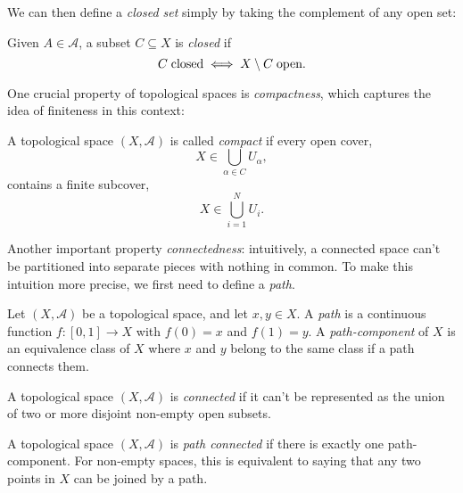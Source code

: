 We can then define a \emph{closed set} simply by taking the complement of any open set:

\begin{definition}
    Given $A \in \mathcal{A}$, a subset $C \subseteq X$ is \emph{closed} if
    \begin{equation}
        C \; \textup{closed} \iff X \setminus C \; \textup{open} .
    \end{equation}
\end{definition}

One crucial property of topological spaces is \emph{compactness}, which captures the idea of finiteness in this context:

\begin{definition}[Compact]
    A topological space $(X,\mathcal{A})$ is called \emph{compact} if every open cover,
    \begin{equation}
        X \in \bigcup_{\alpha \in C} U_\alpha ,
    \end{equation}
    contains a finite subcover,
    \begin{equation}
        X \in \bigcup_{i = 1}^N U_i .
    \end{equation}
\end{definition}

Another important property \emph{connectedness}: intuitively, a connected space can't be partitioned into separate pieces with nothing in common. To make this intuition more precise, we first need to define a \emph{path}.

\begin{definition}[Path]
    Let $(X, \mathcal{A})$ be a topological space, and let $x,y \in X$. A \emph{path} is a continuous function $f : [0,1] \to X$ with $f(0)=x$ and $f(1)=y$. A \emph{path-component} of $X$ is an equivalence class of $X$ where $x$ and $y$ belong to the same class if a path connects them.
\end{definition}

\begin{definition}[Connected]
    A topological space $(X,\mathcal{A})$ is \emph{connected} if it can't be represented as the union of two or more disjoint non-empty open subsets.
\end{definition}

\begin{definition}
    A topological space $(X,\mathcal{A})$ is \emph{path connected} if there is exactly one path-component. For non-empty spaces, this is equivalent to saying that any two points in $X$ can be joined by a path.
\end{definition}

